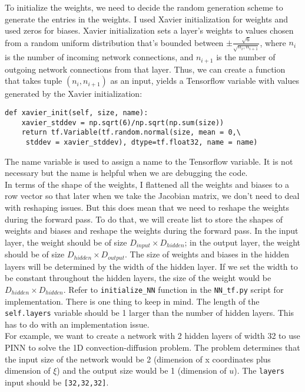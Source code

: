 \documentclass{article}
\begin{document}
To initialize the weights, we need to decide the random generation scheme to generate the entries in the weights. I used Xavier initialization for weights and used zeros for biases. Xavier initialization sets a layer’s weights to values chosen from a random uniform distribution that’s bounded between $\pm \frac{\sqrt{6}}{\sqrt{n_i,n_{i+1}}}$, where $n_i$ is the number of incoming network connections, and $n_{i+1}$ is the number of outgoing network connections from that layer. Thus, we can create a function that takes tuple $(n_i, n_{i+1})$ as an input, yields a Tensorflow variable with values generated by the Xavier initialization:
\begin{lstlisting}
def xavier_init(self, size, name):
	xavier_stddev = np.sqrt(6)/np.sqrt(np.sum(size)) 
	return tf.Variable(tf.random.normal(size, mean = 0,\
	 stddev = xavier_stddev), dtype=tf.float32, name = name)
\end{lstlisting}

The name variable is used to assign a name to the Tensorflow variable. It is not necessary but the name is helpful when we are debugging the code. \\

In terms of the shape of the weights, I flattened all the weights and biases to a row vector so that later when we take the Jacobian matrix, we don't need to deal with reshaping issues. But this does mean that we need to reshape the weights during the forward pass. To do that, we will create list to store the shapes of weights and biases and reshape the weights during the forward pass. In the input layer, the weight should be of size $D_{input}\times D_{hidden}$; in the output layer, the weight should be of size $D_{hidden}\times D_{output}$. The size of weights and biases in the hidden layers will be determined by the width of the hidden layer. If we set the width to be constant throughout the hidden layers, the size of the weight would be $D_{hidden}\times D_{hidden}$. Refer to \texttt{initialize\_NN} function in the \texttt{NN\_tf.py} script for implementation. There is one thing to keep in mind. The length of the \texttt{self.layers} variable should be 1 larger than the number of hidden layers. This has to do with an implementation issue. \\

For example, we want to create a network with 2 hidden layers of width 32 to use PINN to solve the 1D convection-diffusion problem. The problem determines that the input size of the network would be 2 (dimension of x coordinates plus dimension of $\xi$) and the output size would be 1 (dimension of $u$). The \texttt{layers} input should be \texttt{[32,32,32]}. 
\end{document}
